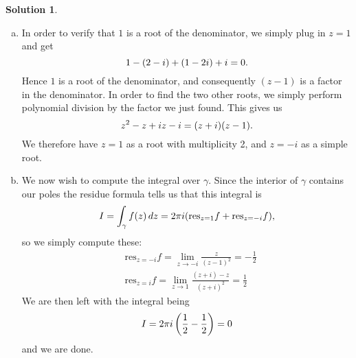 \documentclass[a4paper, 10pt]{amsart}
\theoremstyle{definition}
\newtheorem*{sltn}{Solution}
\newcommand{\res}[2]{\mathrm{res}_{#1}#2}
\begin{document}
\begin{sltn}
  \begin{enumerate}[a)]
    \item In order to verify that $1$ is a root of the denominator, we simply
      plug in $z = 1$ and get
      \begin{equation}
        \notag
        1 - (2 - i) + (1 - 2i) + i = 0.
      \end{equation}
    Hence $1$ is a root of the denominator, and consequently $(z - 1)$ is a
    factor in the denominator. In order to find the two other roots, we simply
    perform polynomial division by the factor we just found. This gives us
    \begin{equation}
      \notag
      z ^ 2 - z + iz - i = (z +i)(z -1).
    \end{equation}
    We therefore have $z=1$ as a root with multiplicity 2, and $z=-i$ as a
    simple root.
    \item
    We now wish to compute the integral over $\gamma$. Since the interior of
    $\gamma$ contains our poles the residue formula tells us that this
    integral is
    \begin{equation}
      \notag
      I = \int_\gamma f(z) \, dz = 2\pi i(\res{z=1}{f} + \res{z=-i}{f}),
    \end{equation}
    so we simply compute these:
    \begin{align*}
      &\res{z=-i}{f} = \lim_{z \to -i} \frac{z}{(z-1)^2} = -\frac{1}{2} \\
      &\res{z=i}{f} = \lim_{z \to 1} \frac{(z + i) - z}{(z + i)^2} = \frac{1}{2}
    \end{align*}
  We are then left with the integral being
  \begin{equation}
    \notag
    I = 2\pi i \left(\frac{1}{2} - \frac{1}{2}\right) = 0
  \end{equation}
  and we are done.
  \end{enumerate}
\end{sltn}
\end{document}
